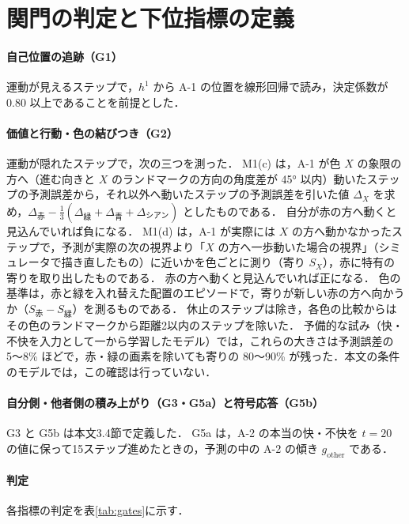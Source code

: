 \section{関門の判定と下位指標の定義}\label{app:gates}

\paragraph{自己位置の追跡（G1）}
運動が見えるステップで，$h^1$ から A-1 の位置を線形回帰で読み，決定係数が 0.80 以上であることを前提とした．

\paragraph{価値と行動・色の結びつき（G2）}
運動が隠れたステップで，次の三つを測った．
M1(c) は，A-1 が色 $X$ の象限の方へ（進む向きと $X$ のランドマークの方向の角度差が 45° 以内）動いたステップの予測誤差から，それ以外へ動いたステップの予測誤差を引いた値 $\Delta_X$ を求め，$\Delta_{\text{赤}}-\frac13(\Delta_{\text{緑}}+\Delta_{\text{青}}+\Delta_{\text{シアン}})$ としたものである．
自分が赤の方へ動くと見込んでいれば負になる．
M1(d) は，A-1 が実際には $X$ の方へ動かなかったステップで，予測が実際の次の視界より「$X$ の方へ一歩動いた場合の視界」（シミュレータで描き直したもの）に近いかを色ごとに測り（寄り $S_X$），赤に特有の寄りを取り出したものである．
赤の方へ動くと見込んでいれば正になる．
色の基準は，赤と緑を入れ替えた配置のエピソードで，寄りが新しい赤の方へ向かうか（$S_{\text{赤}}-S_{\text{緑}}$）を測るものである．
休止のステップは除き，各色の比較からはその色のランドマークから距離2以内のステップを除いた．
予備的な試み（快・不快を入力として一から学習したモデル）では，これらの大きさは予測誤差の 5〜8\% ほどで，赤・緑の画素を除いても寄りの 80〜90\% が残った．本文の条件のモデルでは，この確認は行っていない．

\paragraph{自分側・他者側の積み上がり（G3・G5a）と符号応答（G5b）}
G3 と G5b は本文3.4節で定義した．
G5a は，A-2 の本当の快・不快を $t=20$ の値に保って15ステップ進めたときの，予測の中の A-2 の傾き $g_{\mathrm{other}}$ である．

\paragraph{判定}
各指標の判定を表\ref{tab:gates}に示す．

\begin{table}[tbp]
  \centering
  \small
  \caption{段階Iの関門の判定}
  \label{tab:gates}
  
\end{table}
